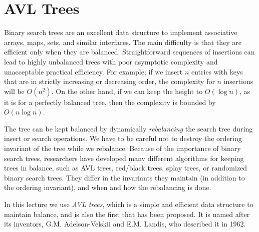 \chapter{AVL Trees}
\label{ch:avl}

\newcommand{\lecnum}{16}
\newcommand{\lecturer}{Frank Pfenning}

\maketitle

\begin{preamble}
\noindent
Binary search trees are an excellent data structure to implement
associative arrays, maps, sets, and similar interfaces.  The main
difficulty is that they are efficient only when they are balanced.
Straightforward sequences of insertions can lead to highly unbalanced
trees with poor asymptotic complexity and unacceptable practical
efficiency.  For example, if we insert $n$ entries with keys that are
in strictly increasing or decreasing order, the complexity for $n$
insertions will be $O(n^2)$.  On the other hand, if we can keep the
height to $O(\log n)$, as it is for a perfectly balanced tree, then
the complexity is bounded by $O(n\log n)$.

The tree can be kept balanced by dynamically \emph{rebalancing} the
search tree during insert or search operations.  We have to be careful
not to destroy the ordering invariant of the tree while we rebalance.
Because of the importance of binary search trees, researchers have
developed many different algorithms for keeping trees in balance, such
as AVL trees, red/black trees, splay trees, or randomized binary
search trees.  They differ in the invariants they maintain (in
addition to the ordering invariant), and when and how the rebalancing
is done.

In this lecture we use \emph{AVL trees}, which is a simple and
efficient data structure to maintain balance, and is also the first
that has been proposed.  It is named after its inventors,
G.M. Adelson-Velskii and E.M. Landis, who described it in 1962.
\end{preamble}

